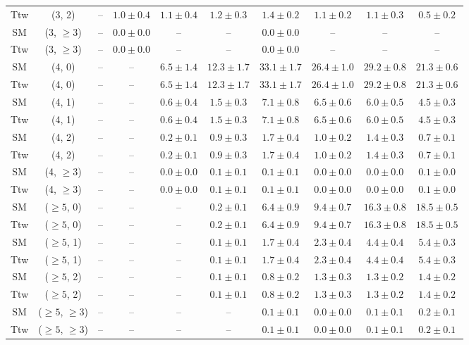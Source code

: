 \begin{table}[h!]
{\begin{tabular}{cccccccccc}
	Ttw & (3, 2) & -- & $1.0\pm 0.4$ & $1.1\pm 0.4$ & $1.2\pm 0.3$ & $1.4\pm 0.2$ & $1.1\pm 0.2$ & $1.1\pm 0.3$ & $0.5\pm 0.2$ \\[0.5ex] 
	SM & (3, $\ge3$) & -- & $0.0\pm 0.0$ & -- & -- & $0.0\pm 0.0$ & -- & -- & -- \\[0.5ex] 
	Ttw & (3, $\ge3$) & -- & $0.0\pm 0.0$ & -- & -- & $0.0\pm 0.0$ & -- & -- & -- \\[0.5ex] 
	SM & (4, 0) & -- & -- & $6.5\pm 1.4$ & $12.3\pm 1.7$ & $33.1\pm 1.7$ & $26.4\pm 1.0$ & $29.2\pm 0.8$ & $21.3\pm 0.6$ \\[0.5ex] 
	Ttw & (4, 0) & -- & -- & $6.5\pm 1.4$ & $12.3\pm 1.7$ & $33.1\pm 1.7$ & $26.4\pm 1.0$ & $29.2\pm 0.8$ & $21.3\pm 0.6$ \\[0.5ex] 
	SM & (4, 1) & -- & -- & $0.6\pm 0.4$ & $1.5\pm 0.3$ & $7.1\pm 0.8$ & $6.5\pm 0.6$ & $6.0\pm 0.5$ & $4.5\pm 0.3$ \\[0.5ex] 
	Ttw & (4, 1) & -- & -- & $0.6\pm 0.4$ & $1.5\pm 0.3$ & $7.1\pm 0.8$ & $6.5\pm 0.6$ & $6.0\pm 0.5$ & $4.5\pm 0.3$ \\[0.5ex] 
	SM & (4, 2) & -- & -- & $0.2\pm 0.1$ & $0.9\pm 0.3$ & $1.7\pm 0.4$ & $1.0\pm 0.2$ & $1.4\pm 0.3$ & $0.7\pm 0.1$ \\[0.5ex] 
	Ttw & (4, 2) & -- & -- & $0.2\pm 0.1$ & $0.9\pm 0.3$ & $1.7\pm 0.4$ & $1.0\pm 0.2$ & $1.4\pm 0.3$ & $0.7\pm 0.1$ \\[0.5ex] 
	SM & (4, $\ge3$) & -- & -- & $0.0\pm 0.0$ & $0.1\pm 0.1$ & $0.1\pm 0.1$ & $0.0\pm 0.0$ & $0.0\pm 0.0$ & $0.1\pm 0.0$ \\[0.5ex] 
	Ttw & (4, $\ge3$) & -- & -- & $0.0\pm 0.0$ & $0.1\pm 0.1$ & $0.1\pm 0.1$ & $0.0\pm 0.0$ & $0.0\pm 0.0$ & $0.1\pm 0.0$ \\[0.5ex] 
	SM & ($\ge5$, 0) & -- & -- & -- & $0.2\pm 0.1$ & $6.4\pm 0.9$ & $9.4\pm 0.7$ & $16.3\pm 0.8$ & $18.5\pm 0.5$ \\[0.5ex] 
	Ttw & ($\ge5$, 0) & -- & -- & -- & $0.2\pm 0.1$ & $6.4\pm 0.9$ & $9.4\pm 0.7$ & $16.3\pm 0.8$ & $18.5\pm 0.5$ \\[0.5ex] 
	SM & ($\ge5$, 1) & -- & -- & -- & $0.1\pm 0.1$ & $1.7\pm 0.4$ & $2.3\pm 0.4$ & $4.4\pm 0.4$ & $5.4\pm 0.3$ \\[0.5ex] 
	Ttw & ($\ge5$, 1) & -- & -- & -- & $0.1\pm 0.1$ & $1.7\pm 0.4$ & $2.3\pm 0.4$ & $4.4\pm 0.4$ & $5.4\pm 0.3$ \\[0.5ex] 
	SM & ($\ge5$, 2) & -- & -- & -- & $0.1\pm 0.1$ & $0.8\pm 0.2$ & $1.3\pm 0.3$ & $1.3\pm 0.2$ & $1.4\pm 0.2$ \\[0.5ex] 
	Ttw & ($\ge5$, 2) & -- & -- & -- & $0.1\pm 0.1$ & $0.8\pm 0.2$ & $1.3\pm 0.3$ & $1.3\pm 0.2$ & $1.4\pm 0.2$ \\[0.5ex] 
	SM & ($\ge5$, $\ge3$) & -- & -- & -- & -- & $0.1\pm 0.1$ & $0.0\pm 0.0$ & $0.1\pm 0.1$ & $0.2\pm 0.1$ \\[0.5ex] 
	Ttw & ($\ge5$, $\ge3$) & -- & -- & -- & -- & $0.1\pm 0.1$ & $0.0\pm 0.0$ & $0.1\pm 0.1$ & $0.2\pm 0.1$ \\[0.5ex] 
	\hline
	\hline
\end{tabular}}
\end{table}
